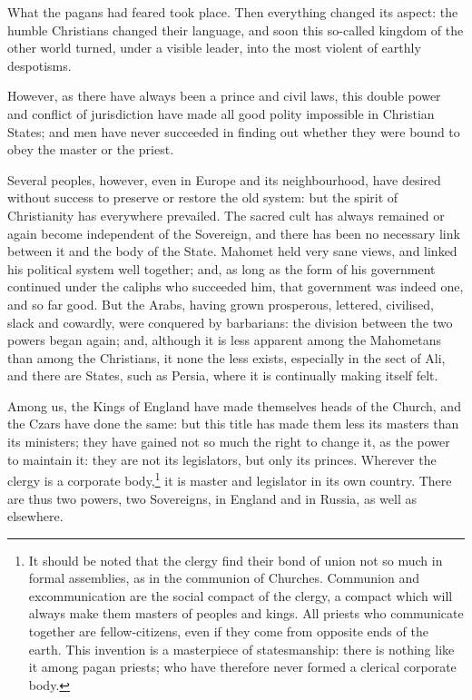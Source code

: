 \documentclass[12pt]{report}
\begin{document}
What the pagans had feared took place. Then everything changed its aspect: the humble Christians changed their language, and soon this so-called kingdom of the other world turned, under a visible leader, into the most violent of earthly despotisms.

However, as there have always been a prince and civil laws, this double power and conflict of jurisdiction have made all good polity impossible in Christian States; and men have never succeeded in finding out whether they were bound to obey the master or the priest.

Several peoples, however, even in Europe and its neighbourhood, have desired without success to preserve or restore the old system: but the spirit of Christianity has everywhere prevailed. The sacred cult has always remained or again become independent of the Sovereign, and there has been no necessary link between it and the body of the State. Mahomet held very sane views, and linked his political system well together; and, as long as the form of his government continued under the caliphs who succeeded him, that government was indeed one, and so far good. But the Arabs, having grown prosperous, lettered, civilised, slack and cowardly, were conquered by barbarians: the division between the two powers began again; and, although it is less apparent among the Mahometans than among the Christians, it none the less exists, especially in the sect of Ali, and there are States, such as Persia, where it is continually making itself felt.

Among us, the Kings of England have made themselves heads of the Church, and the Czars have done the same: but this title has made them less its masters than its ministers; they have gained not so much the right to change it, as the power to maintain it: they are not its legislators, but only its princes. Wherever the clergy is a corporate body,\footnote{It should be noted that the clergy find their bond of union not so much in formal assemblies, as in the communion of Churches. Communion and excommunication are the social compact of the clergy, a compact which will always make them masters of peoples and kings. All priests who communicate together are fellow-citizens, even if they come from opposite ends of the earth. This invention is a masterpiece of statesmanship: there is nothing like it among pagan priests; who have therefore never formed a clerical corporate body.} it is master and legislator in its own country. There are thus two powers, two Sovereigns, in England and in Russia, as well as elsewhere.
\end{document}
